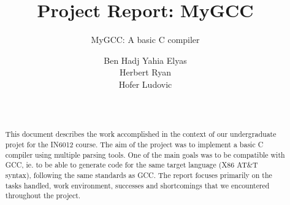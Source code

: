 \documentclass{scrartcl}
\begin{document}
\title{Project Report: MyGCC}
\subtitle{MyGCC: A basic C compiler}
\author{Ben Hadj Yahia Elyas\\Herbert Ryan\\Hofer Ludovic\\\\\\
  \vspace{5cm}{\em University of Bordeaux 1 Science and Technology}}

\maketitle
\newpage
\begin{abstract}
This document describes the work accomplished in the context of our undergraduate projet for the IN6012 course. The aim of the project was to implement a basic C compiler using multiple parsing tools.
One of the main goals was to be compatible with GCC, ie. to be able to generate code for the same target language (X86 AT\&T syntax), following the same standards as GCC.
The report focuses primarily on the tasks handled, work environment, successes and shortcomings that we encountered throughout the project.
\end{abstract}

\vspace{2cm}
\tableofcontents
\newpage 
\end{document}
